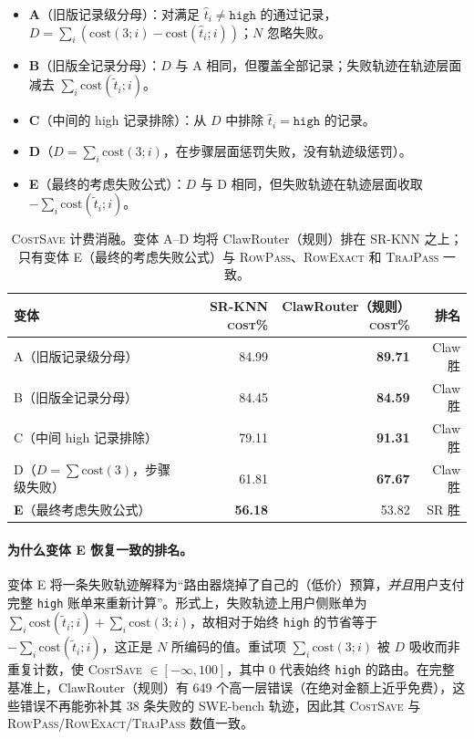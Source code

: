 \begin{itemize}
\item \textbf{A}（旧版记录级分母）：对满足 $\hat{t}_i \ne \texttt{high}$ 的通过记录，$D = \sum_i (\mathrm{cost}(3;i) - \mathrm{cost}(\hat{t}_i;i))$；$N$ 忽略失败。
\item \textbf{B}（旧版全记录分母）：$D$ 与 A 相同，但覆盖全部记录；失败轨迹在轨迹层面减去 $\sum_i \mathrm{cost}(\tilde{t}_i;i)$。
\item \textbf{C}（中间的 high 记录排除）：从 $D$ 中排除 $\hat{t}_i=\texttt{high}$ 的记录。
\item \textbf{D}（$D = \sum_i \mathrm{cost}(3;i)$，在步骤层面惩罚失败，没有轨迹级惩罚）。
\item \textbf{E}（最终的考虑失败公式）：$D$ 与 D 相同，但失败轨迹在轨迹层面收取 $-\sum_i \mathrm{cost}(\tilde{t}_i;i)$。
\end{itemize}

\begin{table}[ht]
\centering
\small
\caption{\textsc{CostSave} 计费消融。变体 A--D 均将 ClawRouter（规则）排在 SR-KNN 之上；只有变体 E（最终的考虑失败公式）与 \textsc{RowPass}、\textsc{RowExact} 和 \textsc{TrajPass} 一致。}
\label{tab:ablation-scoring}
\begin{tabular}{lrrr}
\toprule
变体 & SR-KNN \textsc{cost}\% & ClawRouter（规则）\textsc{cost}\% & 排名 \\
\midrule
A（旧版记录级分母）                  & 84.99 & \textbf{89.71} & Claw 胜 \\
B（旧版全记录分母）                    & 84.45 & \textbf{84.59} & Claw 胜 \\
C（中间 high 记录排除）               & 79.11 & \textbf{91.31} & Claw 胜 \\
D（$D=\sum\mathrm{cost}(3)$，步骤级失败）    & 61.81 & \textbf{67.67} & Claw 胜 \\
\textbf{E}（最终考虑失败公式）          & \textbf{56.18} & 53.82 & SR 胜 \\
\bottomrule
\end{tabular}
\end{table}

\paragraph{为什么变体 E 恢复一致的排名。}
变体 E 将一条失败轨迹解释为“路由器烧掉了自己的（低价）预算，\emph{并且}用户支付完整 \texttt{high} 账单来重新计算”。形式上，失败轨迹上用户侧账单为 $\sum_i \mathrm{cost}(\tilde{t}_i;i) + \sum_i \mathrm{cost}(3;i)$，故相对于始终 \texttt{high} 的节省等于 $-\sum_i \mathrm{cost}(\tilde{t}_i;i)$，这正是 $N$ 所编码的值。重试项 $\sum_i \mathrm{cost}(3;i)$ 被 $D$ 吸收而非重复计数，使 \textsc{CostSave} $\in [-\infty, 100]$，其中 $0$ 代表始终 \texttt{high} 的路由。在完整基准上，ClawRouter（规则）有 649 个高一层错误（在绝对金额上近乎免费），这些错误不再能弥补其 38 条失败的 SWE-bench 轨迹，因此其 \textsc{CostSave} 与 \textsc{RowPass}/\textsc{RowExact}/\textsc{TrajPass} 数值一致。

